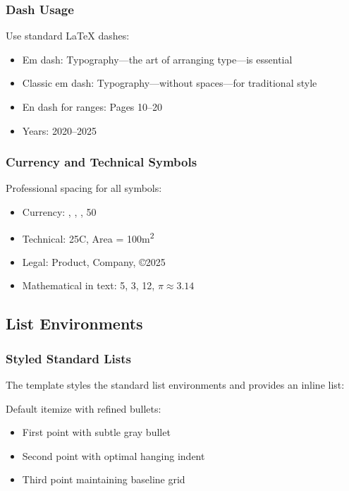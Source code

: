 \subsubsection{Dash Usage}

Use standard LaTeX dashes:

\begin{itemize}
\item Em dash: Typography---the art of arranging type---is essential
\item Classic em dash: Typography---without spaces---for traditional style
\item En dash for ranges: Pages 10--20
\item Years: 2020--2025
\end{itemize}

\subsubsection{Currency and Technical Symbols}

Professional spacing for all symbols:

\begin{itemize}
\item Currency: , , , 50\textcent
\item Technical: 25\textdegree C, Area = 100m\textsuperscript{2}
\item Legal: Product\texttrademark, Company\textregistered, \copyright 2025
\item Mathematical in text: 5, 3, 12, $\pi \approx 3.14$
\end{itemize}

\subsection{List Environments}

\subsubsection{Styled Standard Lists}

The template styles the standard list environments and provides an inline list:

 Default itemize with refined bullets:
\begin{itemize}
\item First point with subtle gray bullet
\item Second point with optimal hanging indent
\item Third point maintaining baseline grid
\end{itemize}


